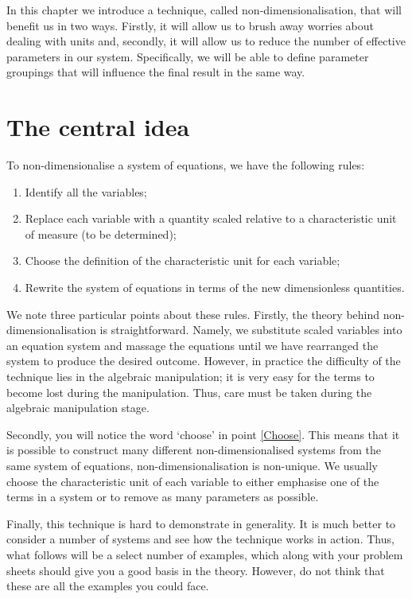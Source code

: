 In this chapter we introduce a technique, called non-dimensionalisation, that will benefit us in two ways. Firstly, it will allow us to brush away worries about dealing with units and, secondly, it will allow us to reduce the number of effective parameters in our system. Specifically, we will be able to define parameter groupings that will influence the final result in the same way.

\section{The central idea}
To non-dimensionalise a system of equations, we have the following rules:
\begin{enumerate}
\item Identify all the variables;
\item Replace each variable with a quantity scaled relative to a characteristic unit of measure (to be determined);
\item Choose the definition of the characteristic unit for each variable;\label{Choose}
\item Rewrite the system of equations in terms of the new dimensionless quantities.
\end{enumerate}
We note three particular points about these rules. Firstly, the theory behind non-dimensionalisation is straightforward. Namely, we substitute scaled variables into an equation system and massage the equations until we have rearranged the system to produce the desired outcome. However, in practice the difficulty of the technique lies in the algebraic manipulation; it is very easy for the terms to become lost during the manipulation. Thus, care must be taken during the algebraic manipulation stage.

Secondly, you will notice the word `choose' in point \ref{Choose}. This means that it is possible to construct many different non-dimensionalised systems from the same system of equations, \ie non-dimensionalisation is non-unique. We usually choose the characteristic unit of each variable to either emphasise one of the terms in a system or to remove as many parameters as possible.

Finally, this technique is hard to demonstrate in generality. It is much better to consider a number of systems and see how the technique works in action. Thus, what follows will be a select number of examples, which along with your problem sheets should give you a good basis in the theory. However, do not think that these are all the examples you could face.

